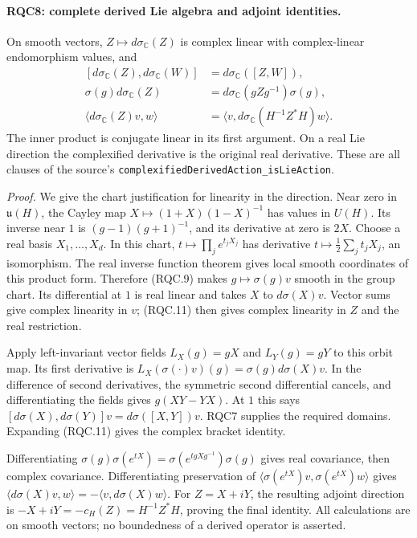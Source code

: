 \documentclass[11pt,a4paper]{article}
\numberwithin{equation}{section}
\theoremstyle{remark}\newtheorem{remark}[theorem]{Remark}
\begin{document}
\paragraph{RQC8: complete derived Lie algebra and adjoint identities.}
\label{claim:RQC8}
On smooth vectors, \(Z\mapsto d\sigma_{\mathbb C}(Z)\) is complex
linear with complex-linear endomorphism values, and
\[
\begin{split}
 [d\sigma_{\mathbb C}(Z),d\sigma_{\mathbb C}(W)]
   &=d\sigma_{\mathbb C}([Z,W]),\\
 \sigma(g)d\sigma_{\mathbb C}(Z)
   &=d\sigma_{\mathbb C}(gZg^{-1})\sigma(g),\\
 \langle d\sigma_{\mathbb C}(Z)v,w\rangle
   &=\langle v,d\sigma_{\mathbb C}(H^{-1}Z^*H)w\rangle.
\end{split}
 \tag{RQC.12}
\]
The inner product is conjugate linear in its first argument.
On a real Lie direction the complexified derivative is the original
real derivative.  These are all clauses of the source's
\texttt{complexifiedDerivedAction\_isLieAction}.

\emph{Proof.}
We give the chart justification for linearity in the direction.
Near zero in \(\mathfrak u(H)\), the Cayley map
\(X\mapsto(1+X)(1-X)^{-1}\) has values in \(U(H)\).
Its inverse near \(1\) is \((g-1)(g+1)^{-1}\), and its derivative
at zero is \(2X\).  Choose a real basis \(X_1,\ldots,X_d\).
In this chart, \(t\mapsto\prod_j e^{t_jX_j}\) has derivative
\(t\mapsto\frac12\sum_jt_jX_j\), an isomorphism.
The real inverse function theorem gives local smooth coordinates
of this product form.  Therefore (RQC.9) makes
\(g\mapsto\sigma(g)v\) smooth in the group chart.  Its differential
at \(1\) is real linear and takes \(X\) to \(d\sigma(X)v\).
Vector sums give complex linearity in \(v\); (RQC.11) then gives
complex linearity in \(Z\) and the real restriction.

Apply left-invariant vector fields \(L_X(g)=gX\) and \(L_Y(g)=gY\)
to this orbit map.  Its first derivative is
\(L_X(\sigma(\cdot)v)(g)=\sigma(g)d\sigma(X)v\).
In the difference of second derivatives, the symmetric second
differential cancels, and differentiating the fields gives
\(g(XY-YX)\).  At \(1\) this says
\([d\sigma(X),d\sigma(Y)]v=d\sigma([X,Y])v\).
RQC7 supplies the required domains.  Expanding (RQC.11) gives
the complex bracket identity.

Differentiating
\(\sigma(g)\sigma(e^{tX})=\sigma(e^{tgXg^{-1}})\sigma(g)\)
gives real covariance, then complex covariance.
Differentiating preservation of
\(\langle\sigma(e^{tX})v,\sigma(e^{tX})w\rangle\) gives
\(\langle d\sigma(X)v,w\rangle=-\langle v,d\sigma(X)w\rangle\).
For \(Z=X+iY\), the resulting adjoint direction is
\(-X+iY=-c_H(Z)=H^{-1}Z^*H\), proving the final identity.
All calculations are on smooth vectors; no boundedness of a
derived operator is asserted.
\end{document}
